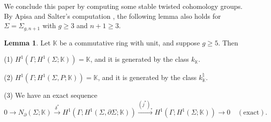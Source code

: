 \documentclass[a4paper,12pt, twoside]{amsart}
\theoremstyle{definition}
\newtheorem{lem}[dfn]{Lemma}
\theoremstyle{remark}
\numberwithin{equation}{section}
\newcommand\bK{{\mathbb{K}}}
\newcommand\pa{\partial}
\begin{document}
\par
We conclude this paper by computing some stable twisted cohomology groups. 
By Apisa and Salter's computation \cite[Theorem A.4]{ApisaSalter}, 
the following lemma also holds for $\Sigma = \Sigma_{g, n+1}$ with $g \geq 3$ and $n+1 \geq 3$. 
\begin{lem}\label{lem:compute} Let $\bK$ be a commutative ring with unit, and suppose $g \geq 5$. Then\par
(1) $H^1(\Gamma; H^1(\Sigma; \bK)) = \bK$, and it is generated by the class $k_\bK$. \par
(2) $H^1(\Gamma; H^1(\Sigma, P; \bK)) = \bK$, and it is generated by the class $k^\natural_\bK$. 
\par
(3) We have an exact sequence
$$
0 \to N_\pa(\Sigma; \bK) \overset{\delta^*}\to 
H^1(\Gamma; H^1(\Sigma, \pa\Sigma; \bK)) \overset{(j^*)_*}\to 
H^1(\Gamma; H^1(\Sigma; \bK)) \to 0 \quad (\text{exact}).
$$
\end{lem}
\end{document}
